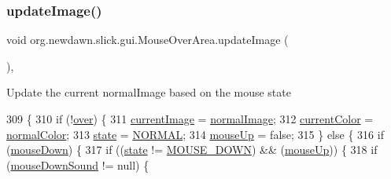 \subsubsection{\texorpdfstring{update\+Image()}{updateImage()}}
{\footnotesize\ttfamily void org.\+newdawn.\+slick.\+gui.\+Mouse\+Over\+Area.\+update\+Image (\begin{DoxyParamCaption}{ }\end{DoxyParamCaption})\hspace{0.3cm}{\ttfamily [inline]}, {\ttfamily [private]}}

Update the current normal\+Image based on the mouse state 
\begin{DoxyCode}
309                                \{
310         \textcolor{keywordflow}{if} (!\mbox{\hyperlink{classorg_1_1newdawn_1_1slick_1_1gui_1_1_mouse_over_area_ac71b080e2b87f755f6e0fb54983877b1}{over}}) \{
311             \mbox{\hyperlink{classorg_1_1newdawn_1_1slick_1_1gui_1_1_mouse_over_area_a4f8987c2e1bbc501ae63b3e8bd0d9777}{currentImage}} = \mbox{\hyperlink{classorg_1_1newdawn_1_1slick_1_1gui_1_1_mouse_over_area_a9d302fcca78d86154144418ef065b04e}{normalImage}};
312             \mbox{\hyperlink{classorg_1_1newdawn_1_1slick_1_1gui_1_1_mouse_over_area_a57b4335d9de8d2c3051689c9e0f69173}{currentColor}} = \mbox{\hyperlink{classorg_1_1newdawn_1_1slick_1_1gui_1_1_mouse_over_area_a03087a0e7e292f9c1be2225d3c36db98}{normalColor}};
313             \mbox{\hyperlink{classorg_1_1newdawn_1_1slick_1_1gui_1_1_mouse_over_area_afdec7c9ac6811ff02b1c51cc35da4a41}{state}} = \mbox{\hyperlink{classorg_1_1newdawn_1_1slick_1_1gui_1_1_mouse_over_area_a807ff20c977a970752b65cf6bd22d509}{NORMAL}};
314             \mbox{\hyperlink{classorg_1_1newdawn_1_1slick_1_1gui_1_1_mouse_over_area_a09d66a79c4523c9b230be218bba9f080}{mouseUp}} = \textcolor{keyword}{false};
315         \} \textcolor{keywordflow}{else} \{
316             \textcolor{keywordflow}{if} (\mbox{\hyperlink{classorg_1_1newdawn_1_1slick_1_1gui_1_1_mouse_over_area_ad1eb1ead0d2c6b907c4b4d4a297da2c0}{mouseDown}}) \{
317                 \textcolor{keywordflow}{if} ((\mbox{\hyperlink{classorg_1_1newdawn_1_1slick_1_1gui_1_1_mouse_over_area_afdec7c9ac6811ff02b1c51cc35da4a41}{state}} != \mbox{\hyperlink{classorg_1_1newdawn_1_1slick_1_1gui_1_1_mouse_over_area_a2246453fdbc61f66bb16a501b70d12e4}{MOUSE\_DOWN}}) && (\mbox{\hyperlink{classorg_1_1newdawn_1_1slick_1_1gui_1_1_mouse_over_area_a09d66a79c4523c9b230be218bba9f080}{mouseUp}})) \{
318                     \textcolor{keywordflow}{if} (\mbox{\hyperlink{classorg_1_1newdawn_1_1slick_1_1gui_1_1_mouse_over_area_aceac9fd935c90a7fef2fbd5204df3de1}{mouseDownSound}} != null) \{

\end{DoxyCode}
